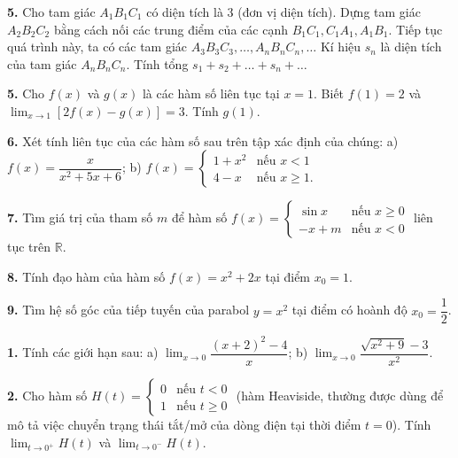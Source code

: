 \documentclass[12pt,a4paper]{extarticle}
\begin{document}
\noindent\textbf{5.} Cho tam giác $A_1 B_1 C_1$ có diện tích là 3 (đơn vị diện tích). Dựng tam giác $A_2 B_2 C_2$ bằng cách nối các trung điểm của các cạnh $B_1 C_1, C_1 A_1, A_1 B_1$. Tiếp tục quá trình này, ta có các tam giác $A_3 B_3 C_3, \dots, A_n B_n C_n, \dots$ Kí hiệu $s_n$ là diện tích của tam giác $A_n B_n C_n$.
\noindent Tính tổng $s_1 + s_2 + \dots + s_n + \dots$

\noindent\textbf{5.} Cho $f(x)$ và $g(x)$ là các hàm số liên tục tại $x = 1$. Biết $f(1) = 2$ và $\lim_{x \to 1} [2f(x) - g(x)] = 3$. Tính $g(1)$.
\vspace{0.4cm}

\noindent\textbf{6.} Xét tính liên tục của các hàm số sau trên tập xác định của chúng:
\noindent a) $f(x) = \dfrac{x}{x^2 + 5x + 6}$;
\noindent b) $f(x) = \begin{cases} 1 + x^2 & \text{nếu } x < 1 \\ 4 - x & \text{nếu } x \ge 1. \end{cases}$
\vspace{0.4cm}

\noindent\textbf{7.} Tìm giá trị của tham số $m$ để hàm số $f(x) = \begin{cases} \sin x & \text{nếu } x \ge 0 \\ -x + m & \text{nếu } x < 0 \end{cases}$ liên tục trên $\mathbb{R}$.
\vspace{0.4cm}

\noindent\textbf{8.} Tính đạo hàm của hàm số $f(x) = x^2 + 2x$ tại điểm $x_0 = 1$.

\noindent\textbf{9.} Tìm hệ số góc của tiếp tuyến của parabol $y = x^2$ tại điểm có hoành độ $x_0 = \dfrac{1}{2}$.

\noindent\textbf{1.} Tính các giới hạn sau:
\noindent a) $\lim_{x \to 0} \dfrac{(x + 2)^2 - 4}{x}$;
\noindent b) $\lim_{x \to 0} \dfrac{\sqrt{x^2 + 9} - 3}{x^2}$.
\vspace{0.4cm}

\noindent\textbf{2.} Cho hàm số $H(t) = \begin{cases} 0 & \text{nếu } t < 0 \\ 1 & \text{nếu } t \ge 0 \end{cases}$ (hàm Heaviside, thường được dùng để mô tả việc chuyển trạng thái tắt/mở của dòng điện tại thời điểm $t = 0$).
\noindent Tính $\lim_{t \to 0^+} H(t)$ và $\lim_{t \to 0^-} H(t)$.
\vspace{0.4cm}
\end{document}
